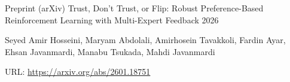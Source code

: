 

\begin{cventries}

  \cventry
    {Preprint (arXiv)} %
    {Trust, Don't Trust, or Flip: Robust Preference-Based Reinforcement Learning with Multi-Expert Feedback} %
    {} %
    {2026} %
    {
      \begin{cvitems} %
        \item {Seyed Amir Hosseini, Maryam Abdolali, Amirhosein Tavakkoli, Fardin Ayar, Ehsan Javanmardi, Manabu Tsukada, Mahdi Javanmardi}
        \item {URL: \url{https://arxiv.org/abs/2601.18751}}
      \end{cvitems}
    }
\end{cventries}
